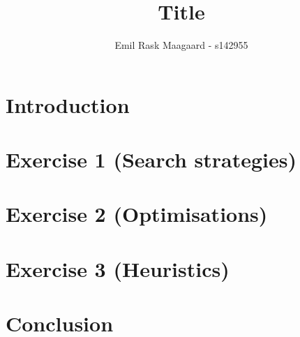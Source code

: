 \documentclass{dtu_report_short}
\title{Title}
\author{Emil Rask Maagaard - s142955}
\begin{document}
\maketitle{}
\titlepage


\section*{Introduction}



\section*{Exercise 1 (Search strategies)}


\section*{Exercise 2 (Optimisations)}


\section*{Exercise 3 (Heuristics)}



\section*{Conclusion}

\end{document}
